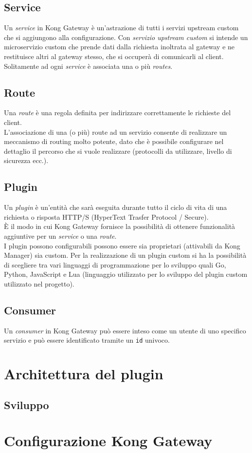 \subsection{Service}\label{sec:kongservice}
Un \emph{service} in Kong Gateway è un’astrazione di tutti i servizi upstream custom che si aggiungono alla configurazione. Con \emph{servizio upstream custom} si intende un microservizio custom che prende dati dalla richiesta inoltrata al gateway e ne restituisce altri al gateway stesso, che si occuperà di comunicarli al client.\\
Solitamente ad ogni \emph{service} è associata una o più \emph{routes}.\\

\subsection{Route}\label{sec:kongroute}
Una \emph{route} è una regola definita per indirizzare correttamente le richieste del client.\\
L’associazione di una (o più) route ad un servizio consente di realizzare un meccanismo di routing molto potente, dato che è possibile configurare nel dettaglio il percorso che si vuole realizzare (protocolli da utilizzare, livello di sicurezza ecc.).\\

\subsection{Plugin}\label{sec:kongplugin}
Un \emph{plugin} è un’entità che sarà eseguita durante tutto il ciclo di vita di una richiesta o risposta HTTP/S (HyperText Trasfer Protocol / Secure).\\
È il modo in cui Kong Gateway fornisce la possibilità di ottenere funzionalità aggiuntive per un \emph{service} o una \emph{route}.\\
I plugin possono configurabili possono essere sia proprietari (attivabili da Kong Manager) sia custom. Per la realizzazione di un plugin custom si ha la possibilità di scegliere tra vari linguaggi di programmazione per lo sviluppo quali Go, Python, JavaScript e Lua (linguaggio utilizzato per lo sviluppo del plugin custom utilizzato nel progetto).\\ 

\subsection{Consumer}\label{sec:kongconsumer}
Un \emph{consumer} in Kong Gateway può essere inteso come un utente di uno specifico servizio e può essere identificato tramite un \texttt{id} univoco.

\section{Architettura del plugin}\label{sec:architetturaplugin}
\subsection{Sviluppo}\label{sec:sviluppoplugin}

\section{Configurazione Kong Gateway}\label{sec:kongconf}